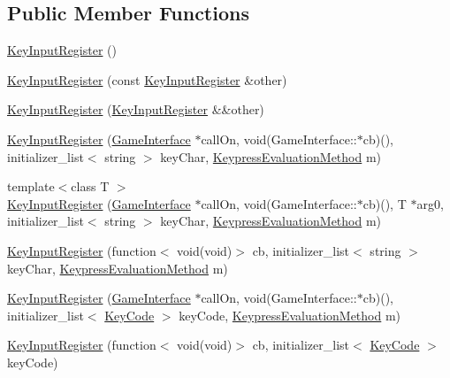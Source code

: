 \subsection*{Public Member Functions}
\begin{DoxyCompactItemize}
\item 
\hyperlink{class_key_input_register_a6a51b43c1ceadda862deed824456434e}{Key\-Input\-Register} ()
\item 
\hyperlink{class_key_input_register_ac0c481b0e43fdad2965d547477412a89}{Key\-Input\-Register} (const \hyperlink{class_key_input_register}{Key\-Input\-Register} \&other)
\item 
\hyperlink{class_key_input_register_a965d3c77c5f5edd8a6e376cd8bf0a55f}{Key\-Input\-Register} (\hyperlink{class_key_input_register}{Key\-Input\-Register} \&\&other)
\item 
\hyperlink{class_key_input_register_a19aa82ae77df55f40f3fcbbf37d6e78a}{Key\-Input\-Register} (\hyperlink{class_game_interface}{Game\-Interface} $\ast$call\-On, void(Game\-Interface\-::$\ast$cb)(), initializer\-\_\-list$<$ string $>$ key\-Char, \hyperlink{_input_8hpp_ac32d0351518cb71146a1cd777bc4fc91}{Keypress\-Evaluation\-Method} m)
\item 
{\footnotesize template$<$class T $>$ }\\\hyperlink{class_key_input_register_aa4e8032393db889d4835183891b4a4f5}{Key\-Input\-Register} (\hyperlink{class_game_interface}{Game\-Interface} $\ast$call\-On, void(Game\-Interface\-::$\ast$cb)(), T $\ast$arg0, initializer\-\_\-list$<$ string $>$ key\-Char, \hyperlink{_input_8hpp_ac32d0351518cb71146a1cd777bc4fc91}{Keypress\-Evaluation\-Method} m)
\item 
\hyperlink{class_key_input_register_a2fd8e4aeb3e624f4c6f86ba34481c4ee}{Key\-Input\-Register} (function$<$ void(void)$>$ cb, initializer\-\_\-list$<$ string $>$ key\-Char, \hyperlink{_input_8hpp_ac32d0351518cb71146a1cd777bc4fc91}{Keypress\-Evaluation\-Method} m)
\item 
\hyperlink{class_key_input_register_a261ad3b9948e06fb843459393ee2489f}{Key\-Input\-Register} (\hyperlink{class_game_interface}{Game\-Interface} $\ast$call\-On, void(Game\-Interface\-::$\ast$cb)(), initializer\-\_\-list$<$ \hyperlink{_input_8hpp_ad39c2e59d8cf6782d7ab90b73c0d0ada}{Key\-Code} $>$ key\-Code, \hyperlink{_input_8hpp_ac32d0351518cb71146a1cd777bc4fc91}{Keypress\-Evaluation\-Method} m)
\item 
\hyperlink{class_key_input_register_a27e34e2fc96aa8b92583c1dca8dcb0e7}{Key\-Input\-Register} (function$<$ void(void)$>$ cb, initializer\-\_\-list$<$ \hyperlink{_input_8hpp_ad39c2e59d8cf6782d7ab90b73c0d0ada}{Key\-Code} $>$ key\-Code)

\end{DoxyCompactItemize}
